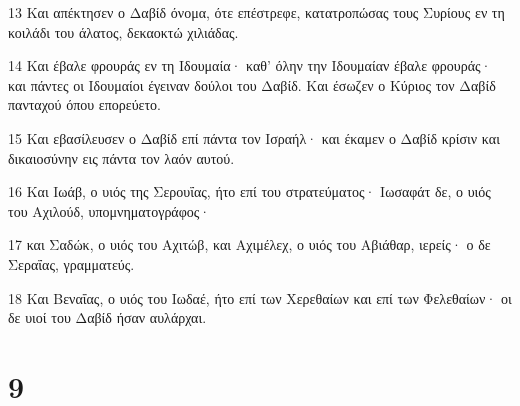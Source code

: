\par 13 Και απέκτησεν ο Δαβίδ όνομα, ότε επέστρεφε, κατατροπώσας τους Συρίους εν τη κοιλάδι του άλατος, δεκαοκτώ χιλιάδας.
\par 14 Και έβαλε φρουράς εν τη Ιδουμαία· καθ' όλην την Ιδουμαίαν έβαλε φρουράς· και πάντες οι Ιδουμαίοι έγειναν δούλοι του Δαβίδ. Και έσωζεν ο Κύριος τον Δαβίδ πανταχού όπου επορεύετο.
\par 15 Και εβασίλευσεν ο Δαβίδ επί πάντα τον Ισραήλ· και έκαμεν ο Δαβίδ κρίσιν και δικαιοσύνην εις πάντα τον λαόν αυτού.
\par 16 Και Ιωάβ, ο υιός της Σερουΐας, ήτο επί του στρατεύματος· Ιωσαφάτ δε, ο υιός του Αχιλούδ, υπομνηματογράφος·
\par 17 και Σαδώκ, ο υιός του Αχιτώβ, και Αχιμέλεχ, ο υιός του Αβιάθαρ, ιερείς· ο δε Σεραΐας, γραμματεύς.
\par 18 Και Βεναΐας, ο υιός του Ιωδαέ, ήτο επί των Χερεθαίων και επί των Φελεθαίων· οι δε υιοί του Δαβίδ ήσαν αυλάρχαι.

\chapter{9}

